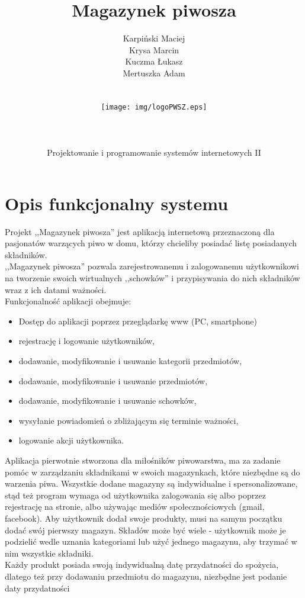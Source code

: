 \documentclass[12pt,a4paper]{article}
\author{Karpiński Maciej\\Krysa Marcin\\Kuczma Łukasz\\Mertuszka Adam\\\\\\\texttt{[image: img/logoPWSZ.eps]}\\\\\\\\Projektowanie i programowanie systemów internetowych II}
\title{Magazynek piwosza}
\begin{document}
	\maketitle
	\thispagestyle{empty}
	\clearpage

	\tableofcontents
	\newpage

	\section{Opis funkcjonalny systemu}
			\indent Projekt ,,Magazynek piwosza'' jest aplikacją internetową przeznaczoną dla pasjonatów warzących piwo w domu, którzy chcieliby posiadać listę posiadanych składników.\\
		\indent ,,Magazynek piwosza'' pozwala zarejestrowanemu i zalogowanemu użytkownikowi na tworzenie swoich wirtualnych ,,schowków'' i przypisywania do nich
		składników wraz z ich datami ważności.\\
		\indent Funkcjonalność aplikacji obejmuje:
		\begin{itemize}
			\item Dostęp do aplikacji poprzez przeglądarkę www (PC, smartphone)
			\item rejestrację i logowanie użytkowników,
			\item dodawanie, modyfikowanie i usuwanie kategorii przedmiotów,
			\item dodawanie, modyfikowanie i usuwanie przedmiotów,
			\item dodawanie, modyfikowanie i usuwanie schowków,
			\item wysyłanie powiadomień o zbliżającym się terminie ważności,
			\item logowanie akcji użytkownika.
		\end{itemize}
		\indent Aplikacja pierwotnie stworzona dla miłośników piwowarstwa, ma za zadanie pomóc w zarządzaniu składnikami w swoich magazynkach, które niezbędne
			są do warzenia piwa. Wszystkie dodane magazyny są indywidualne i spersonalizowane, stąd też program wymaga od użytkownika zalogowania się albo poprzez rejestrację
			na stronie, albo używając mediów społecznościowych (gmail, facebook). Aby użytkownik dodał swoje produkty, musi na samym początku dodać swój pierwszy magazyn.
			Składów może być wiele - użytkownik może je podzielić wedle uznania kategoriami lub użyć jednego magazynu, aby trzymać w nim wszystkie składniki.\\
		\indent Każdy produkt posiada swoją indywidualną datę przydatności do spożycia, dlatego też przy dodawaniu przedmiotu do magazynu, niezbędne jest podanie daty przydatności
\end{document}
